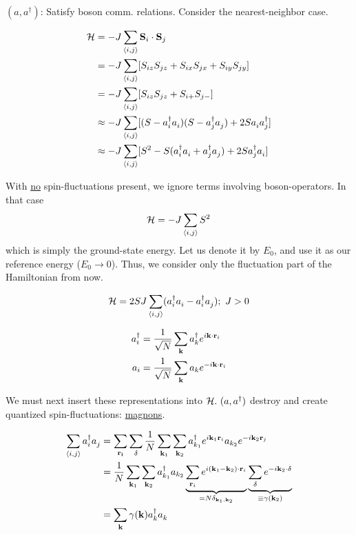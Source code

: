 $(a, a^\dagger)$: Satisfy boson comm. relations. Consider the nearest-neighbor case.

\begin{align}
    \mathcal{H} &= -J\sum_{\langle i,j \rangle} \vb{S}_i\cdot\vb{S}_j \\
    &= -J\sum_{\langle i, j \rangle}[S_{iz}S_{jz} + S_{ix}S_{jx} + S_{iy}S_{jy}]\\
    &= -J\sum_{\langle i, j \rangle}[S_{iz}S_{jz} + S_{i+}S_{j-}] \\
    &\approx -J\sum_{\langle i, j \rangle}[(S-a_i^\dagger a_i^{})(S-a_j^\dagger a_j^{}) + 2S a_i^{} a_j^\dagger]\\
    &\approx -J\sum_{\langle i, j \rangle}[S^2 - S(a_i^\dagger a_i^{} + a_j^\dagger a_j^{}) + 2S a_j^\dagger a_i^{}]
\end{align}

With \uline{no} spin-fluctuations present, we ignore terms involving boson-operators. In that case 
\begin{equation}
    \mathcal{H} = -J \sum_{\langle i, j \rangle} S^2
\end{equation}
which is simply the ground-state energy. Let us denote it by $E_0$, and use it as our reference energy ($E_0 \rightarrow 0$). Thus, we consider only the fluctuation part of the Hamiltonian from now.

\begin{equation}
    \mathcal{H} = 2SJ\sum_{\langle i, j \rangle} (a_i^\dagger a_i^{} - a_i^\dagger a_j^{}); \ J > 0
\end{equation}

\begin{align}
    a_i^\dagger &= \frac{1}{\sqrt{N}}\sum_{\vb{k}}a_k^\dagger e^{i\vb{k}\cdot\vb{r}_i} \\
    a_i &= \frac{1}{\sqrt{N}}\sum_{\vb{k}}a_k e^{-i\vb{k}\cdot\vb{r}_i}
\end{align}

We must next insert these representations into $\mathcal{H}. \ (a, a^\dagger)$ destroy and create quantized spin-fluctuations: \uline{magnons}.

\begin{align}
    \sum_{\langle i, j \rangle} a_i^\dagger a_j^{}
    &= \sum_{\vb{r_i}}\sum_{\vb{\delta}} \frac{1}{N}\sum_{\vb{k}_1}\sum_{\vb{k}_2}a_{k_1}^\dagger e^{i\vb{k}_1\vb{r}_i} a_{k_2} e^{-i\vb{k}_2\vb{r}_j} \\
    &= \frac{1}{N}\sum_{\vb{k}_1}\sum_{\vb{k}_2}a_{k_1}^\dagger a_{k_2} \underbrace{\sum_{\vb{r}_i}e^{i(\vb{k}_1 - \vb{k}_2)\cdot\vb{r}_i}}_{= N \delta_{\vb{k}_1, \vb{k}_2}} \underbrace{\sum_{\vb{\delta}}e^{-i\vb{k}_2\cdot \vb{\delta}}}_{\equiv\gamma(\vb{k}_2)} \\
    &= \sum_{\vb{k}}\gamma(\vb{k})a_k^\dagger a_k^{}
\end{align}

